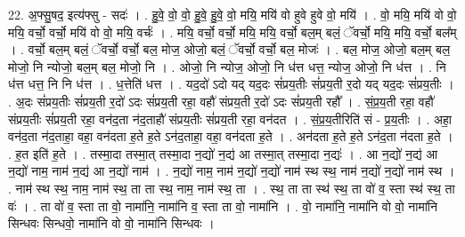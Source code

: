 \documentclass[17pt]{extarticle}
\begin{document}
22. अ॒फ्सु॒षद॒ इत्य॑फ्सु - सदः॑ । . हु॒वे॒ वो॒ वो॒ हु॒वे॒ हु॒वे॒ वो॒ मयि॒ मयि॑ वो हुवे हुवे वो॒ मयि॑ । . वो॒ मयि॒ मयि॑ वो वो॒ मयि॒ वर्चो॒ वर्चो॒ मयि॑ वो वो॒ मयि॒ वर्चः॑ । . मयि॒ वर्चो॒ वर्चो॒ मयि॒ मयि॒ वर्चो॒ बल॒म् बलं॒ ॅवर्चो॒ मयि॒ मयि॒ वर्चो॒ बल᳚म् । . वर्चो॒ बल॒म् बलं॒ ॅवर्चो॒ वर्चो॒ बल॒ मोज॒ ओजो॒ बलं॒ ॅवर्चो॒ वर्चो॒ बल॒ मोजः॑ । . बल॒ मोज॒ ओजो॒ बल॒म् बल॒ मोजो॒ नि न्योजो॒ बल॒म् बल॒ मोजो॒ नि । . ओजो॒ नि न्योज॒ ओजो॒ नि ध॑त्त धत्त॒ न्योज॒ ओजो॒ नि ध॑त्त । . नि ध॑त्त धत्त॒ नि नि ध॑त्त । . ध॒त्तेति॑ धत्त । . यद॒दो॑ ऽदो यद् यद॒दः सं॑प्रय॒तीः सं॑प्रय॒ती र॒दो यद् यद॒दः सं॑प्रय॒तीः । . अ॒दः सं॑प्रय॒तीः सं॑प्रय॒ती र॒दो॑ ऽदः सं॑प्रय॒ती रहा॒ वहौ॑ संप्रय॒ती र॒दो॑ ऽदः सं॑प्रय॒ती रहौ᳚ । . सं॒प्र॒य॒ती रहा॒ वहौ॑ संप्रय॒तीः सं॑प्रय॒ती रहा॒ वन॑द॒ता न॑द॒ताहौ॑ संप्रय॒तीः सं॑प्रय॒ती रहा॒ वन॑दत । . सं॒प्र॒य॒तीरिति॑ सं - प्र॒य॒तीः । . अहा॒ वन॑द॒ता न॑द॒ताहा॒ वहा॒ वन॑दता ह॒ते ह॒ते ऽन॑द॒ताहा॒ वहा॒ वन॑दता ह॒ते । . अन॑दता ह॒ते ह॒ते ऽन॑द॒ता न॑दता ह॒ते । . ह॒त इति॑ ह॒ते । . तस्मा॒दा तस्मा॒त् तस्मा॒दा न॒द्यो॑ न॒द्य॑ आ तस्मा॒त् तस्मा॒दा न॒द्यः॑ । . आ न॒द्यो॑ न॒द्य॑ आ न॒द्यो॑ नाम॒ नाम॑ न॒द्य॑ आ न॒द्यो॑ नाम॑ । . न॒द्यो॑ नाम॒ नाम॑ न॒द्यो॑ न॒द्यो॑ नाम॑ स्थ स्थ॒ नाम॑ न॒द्यो॑ न॒द्यो॑ नाम॑ स्थ । . नाम॑ स्थ स्थ॒ नाम॒ नाम॑ स्थ॒ ता ता स्थ॒ नाम॒ नाम॑ स्थ॒ ता । . स्थ॒ ता ता स्थ॑ स्थ॒ ता वो॑ व॒ स्ता स्थ॑ स्थ॒ ता वः॑ । . ता वो॑ व॒ स्ता ता वो॒ नामा॑नि॒ नामा॑नि व॒ स्ता ता वो॒ नामा॑नि । . वो॒ नामा॑नि॒ नामा॑नि वो वो॒ नामा॑नि सिन्धवः सिन्धवो॒ नामा॑नि वो वो॒ नामा॑नि सिन्धवः । \newline
\end{document}
